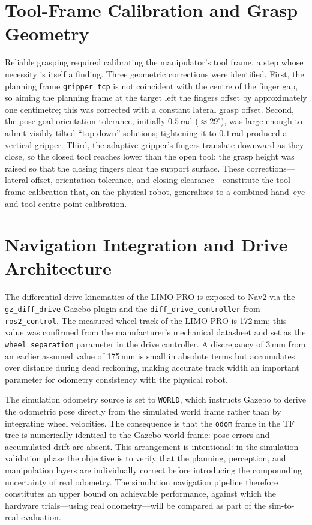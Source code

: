\section{Tool-Frame Calibration and Grasp Geometry}
Reliable grasping required calibrating the manipulator's tool frame, a step whose
necessity is itself a finding. Three geometric corrections were identified. First, the
planning frame \texttt{gripper\_tcp} is not coincident with the centre of the finger
gap, so aiming the planning frame at the target left the fingers offset by approximately
one centimetre; this was corrected with a constant lateral grasp offset. Second, the
pose-goal orientation tolerance, initially $0.5$\,rad ($\approx29^{\circ}$), was large
enough to admit visibly tilted ``top-down'' solutions; tightening it to $0.1$\,rad
produced a vertical gripper. Third, the adaptive gripper's fingers translate downward as
they close, so the closed tool reaches lower than the open tool; the grasp height was
raised so that the closing fingers clear the support surface. These corrections---lateral
offset, orientation tolerance, and closing clearance---constitute the tool-frame
calibration that, on the physical robot, generalises to a combined hand--eye and
tool-centre-point calibration.

\section{Navigation Integration and Drive Architecture}
The differential-drive kinematics of the LIMO PRO is exposed to Nav2 via the
\texttt{gz\_diff\_drive} Gazebo plugin and the \texttt{diff\_drive\_controller} from
\texttt{ros2\_control}. The measured wheel track of the LIMO PRO is 172\,mm; this
value was confirmed from the manufacturer's mechanical datasheet and set as the
\texttt{wheel\_separation} parameter in the drive controller. A discrepancy of 3\,mm
from an earlier assumed value of 175\,mm is small in absolute terms but accumulates
over distance during dead reckoning, making accurate track width an important parameter
for odometry consistency with the physical robot.

The simulation odometry source is set to \texttt{WORLD}, which instructs Gazebo to
derive the odometric pose directly from the simulated world frame rather than by
integrating wheel velocities. The consequence is that the \texttt{odom} frame in the
TF tree is numerically identical to the Gazebo world frame: pose errors and accumulated
drift are absent. This arrangement is intentional: in the simulation validation phase
the objective is to verify that the planning, perception, and manipulation layers are
individually correct before introducing the compounding uncertainty of real odometry.
The simulation navigation pipeline therefore constitutes an upper bound on achievable
performance, against which the hardware trials---using real odometry---will be compared
as part of the sim-to-real evaluation.

